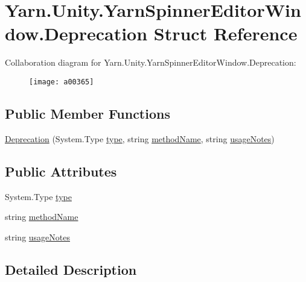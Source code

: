 \hypertarget{a00048}{\section{Yarn.\-Unity.\-Yarn\-Spinner\-Editor\-Window.\-Deprecation Struct Reference}
\label{a00048}
}


Collaboration diagram for Yarn.\-Unity.\-Yarn\-Spinner\-Editor\-Window.\-Deprecation\-:
\nopagebreak
\begin{figure}[H]
\begin{center}
\leavevmode
\texttt{[image: a00365]}
\end{center}
\end{figure}
\subsection*{Public Member Functions}
\begin{DoxyCompactItemize}
\item 
\hyperlink{a00048_ae80171841e97a48611c51a9a574a2fc0}{Deprecation} (System.\-Type \hyperlink{a00048_a750904df254223bf3131c39017f90a0b}{type}, string \hyperlink{a00048_a61605b2d0a17dfdf9c62952270d44fbd}{method\-Name}, string \hyperlink{a00048_ac23509be7ae6b43a3e2154dd430954a7}{usage\-Notes})
\end{DoxyCompactItemize}
\subsection*{Public Attributes}
\begin{DoxyCompactItemize}
\item 
System.\-Type \hyperlink{a00048_a750904df254223bf3131c39017f90a0b}{type}
\item 
string \hyperlink{a00048_a61605b2d0a17dfdf9c62952270d44fbd}{method\-Name}
\item 
string \hyperlink{a00048_ac23509be7ae6b43a3e2154dd430954a7}{usage\-Notes}
\end{DoxyCompactItemize}


\subsection{Detailed Description}


